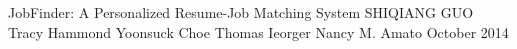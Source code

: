 \approvalfour
{JobFinder: A Personalized Resume-Job Matching System
}
{SHIQIANG GUO}%
{Tracy Hammond
}
{Yoonsuck  Choe
}
{Thomas Ieorger
}
{Nancy M. Amato}
{October 2014}%

%
%

